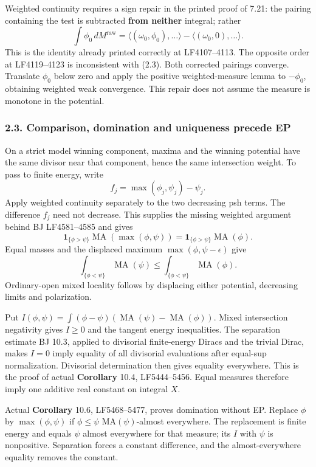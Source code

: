 \documentclass[
  10pt,
]{article}
\begin{document}
Weighted continuity requires a sign repair in the printed proof of 7.21:
the pairing containing the test is subtracted \textbf{from neither}
integral; rather \[
 \int \phi_0\,dM^{\mathrm{raw}}
 =\langle(\omega_0,\phi_0),\ldots\rangle
  -\langle(\omega_0,0),\ldots\rangle. \tag{2.5}
\] This is the identity already printed correctly at LF4107--4113. The
opposite order at LF4119--4123 is inconsistent with (2.3). Both
corrected pairings converge. Translate \(\phi_0\) below zero and apply
the positive weighted-measure lemma to \(-\phi_0\), obtaining weighted
weak convergence. This repair does not assume the measure is monotone in
the potential.

\subsubsection{2.3. Comparison, domination and uniqueness precede
EP}\label{comparison-domination-and-uniqueness-precede-ep}

On a strict model winning component, maxima and the winning potential
have the same divisor near that component, hence the same intersection
weight. To pass to finite energy, write
\[ f_j=\max(\phi_j,\psi_j)-\psi_j.\] Apply weighted continuity
separately to the two decreasing psh terms. The difference \(f_j\) need
not decrease. This supplies the missing weighted argument behind BJ
LF4581--4585 and gives \[
 \mathbf1_{\{\phi>\psi\}}\operatorname{MA}(\max(\phi,\psi))
 =\mathbf1_{\{\phi>\psi\}}\operatorname{MA}(\phi). \tag{2.6}
\] Equal masses and the displaced maximum \(\max(\phi,\psi-\epsilon)\)
give \[\int_{\{\phi<\psi\}}\operatorname{MA}(\psi)
 \le\int_{\{\phi<\psi\}}\operatorname{MA}(\phi). \tag{2.7}\]
Ordinary-open mixed locality follows by displacing either potential,
decreasing limits and polarization.

Put
\(I(\phi,\psi)=\int(\phi-\psi)(\operatorname{MA}(\psi)-\operatorname{MA}(\phi))\).
Mixed intersection negativity gives \(I\ge0\) and the tangent energy
inequalities. The separation estimate BJ 10.3, applied to divisorial
finite-energy Diracs and the trivial Dirac, makes \(I=0\) imply equality
of all divisorial evaluations after equal-sup normalization. Divisorial
determination then gives equality everywhere. This is the proof of
actual \textbf{Corollary} 10.4, LF5444--5456. Equal measures therefore
imply one additive real constant on integral \(X\).

Actual \textbf{Corollary} 10.6, LF5468--5477, proves domination without
EP. Replace \(\phi\) by \(\max(\phi,\psi)\) if \(\phi\le\psi\)
MA\((\psi)\)-almost everywhere. The replacement is finite energy and
equals \(\psi\) almost everywhere for that measure; its \(I\) with
\(\psi\) is nonpositive. Separation forces a constant difference, and
the almost-everywhere equality removes the constant.
\end{document}
